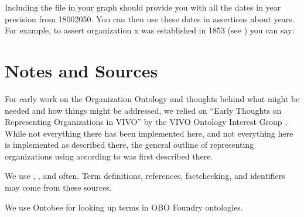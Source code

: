 \documentclass[letterpaper,10pt,english]{sphinxmanual}
\begin{document}
\sphinxAtStartPar
Including the file  in your graph should provide you with all the
dates in year precision from 1800\sphinxhyphen{}2050.  You can then use these dates in
assertions about years.  For example, to assert organization x was
established in 1853 (see {\hyperref[\detokenize{datetimes::doc}]{}}) you can say:

\begin{sphinxVerbatim}[commandchars=\\\{\}]
  
  
  
  
  
\end{sphinxVerbatim}


\chapter{Notes and Sources}
\label{\detokenize{notes-and-sources:notes-and-sources}}\label{\detokenize{notes-and-sources::doc}}
\sphinxAtStartPar
For early work on the Organization Ontology and thoughts behind what might be needed
and how things might be addressed, we relied on “Early Thoughts on Representing
Organizations in VIVO” by the VIVO Ontology Interest Group .  While not
everything there
has been implemented here, and not everything here is implemented as described there,
the general outline of representing organizations using  according to  was
first described there.

\sphinxAtStartPar
We use , , and  often.  Term definitions,
references, fact\sphinxhyphen{}checking, and identifiers may come from these sources.

\sphinxAtStartPar
We use Ontobee  for looking up terms in OBO Foundry ontologies.
\end{document}
